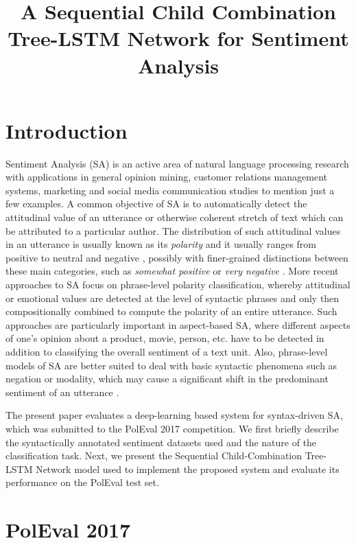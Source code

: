 \documentclass[10pt, a4paper]{article}
\title{A Sequential Child Combination Tree-LSTM Network for Sentiment Analysis}
\begin{document}
\maketitleabstract

\section{Introduction}   
Sentiment Analysis (SA) is an active area of natural language processing research with applications in general opinion mining, customer relations management systems, marketing and social media communication studies to mention just a few examples. A common objective of SA is to automatically detect the attitudinal value of an utterance or otherwise coherent stretch of text which can be attributed to a particular author. The distribution of  such attitudinal values in an utterance is usually known as its \textit{polarity} and it usually ranges from positive to neutral and negative \cite{cambria_schuller}, possibly with finer-grained distinctions between these main categories, such as \textit{somewhat positive} or \textit{very negative} \cite{socher2013recursive}. More recent approaches to SA focus on phrase-level polarity classification, whereby attitudinal or emotional values are detected at the level of syntactic phrases and only then compositionally combined to compute the polarity of an entire utterance. Such approaches are particularly important in aspect-based SA, where different aspects of one's opinion about a product, movie, person, etc. have to be detected in addition to  classifying the overall sentiment of a text unit. Also, phrase-level models of SA are better suited to deal with basic syntactic phenomena such as negation or modality, which may cause a significant shift in the predominant sentiment of an utterance \cite{wilson_wiebe}. 
\par The present paper evaluates a deep-learning based system for syntax-driven SA, which was submitted to the PolEval 2017 competition. We first briefly describe the syntactically annotated sentiment datasets used and the nature of the classification task. Next, we present the Sequential Child-Combination Tree-LSTM Network model used to implement the proposed system and evaluate its performance on the PolEval test set.


\section{PolEval 2017}
\end{document}
